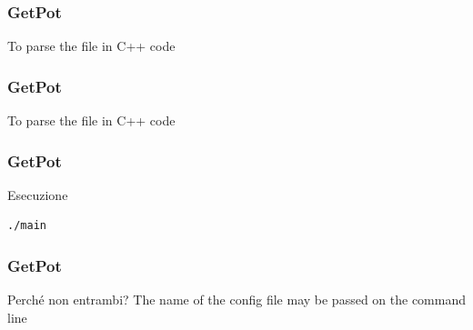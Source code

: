 \documentclass[smaller,a4paper]{beamer}
\begin{document}

\begin{frame}[fragile]

    \frametitle{GetPot}

    \begin{block}{To parse the file in C++ code}
        \lstset{basicstyle=\scriptsize\sf}
            
        \lstset{basicstyle=\sf}
    \end{block}

\end{frame}


\begin{frame}[fragile]

    \frametitle{GetPot}

    \begin{block}{To parse the file in C++ code}
        \lstset{basicstyle=\scriptsize\sf}
            
        \lstset{basicstyle=\sf}
    \end{block}

\end{frame}


\begin{frame}[fragile]

    \frametitle{GetPot}

        \begin{block}{Esecuzione}
            \begin{verbatim}
./main
            \end{verbatim}
        \end{block}

\end{frame}



\begin{frame}[fragile]

    \frametitle{GetPot}

    \begin{block}{Perch\'e non entrambi?}
        The name of the config file may be passed on the command line
        
    \end{block}

\end{frame}
\end{document}
